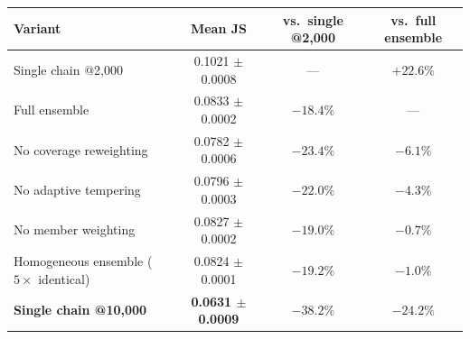 \begin{tabular}{lccc}
\toprule
Variant & Mean JS & vs.\ single @2{,}000 & vs.\ full ensemble \\
\midrule
Single chain @2{,}000 & 0.1021 $\pm$ 0.0008 & --- & $+22.6\%$ \\
Full ensemble & 0.0833 $\pm$ 0.0002 & $-18.4\%$ & --- \\
No coverage reweighting & 0.0782 $\pm$ 0.0006 & $-23.4\%$ & $-6.1\%$ \\
No adaptive tempering & 0.0796 $\pm$ 0.0003 & $-22.0\%$ & $-4.3\%$ \\
No member weighting & 0.0827 $\pm$ 0.0002 & $-19.0\%$ & $-0.7\%$ \\
Homogeneous ensemble ($5\times$ identical) & 0.0824 $\pm$ 0.0001 & $-19.2\%$ & $-1.0\%$ \\
\textbf{Single chain @10{,}000} & \textbf{0.0631 $\pm$ 0.0009} & \textbf{$-38.2\%$} & \textbf{$-24.2\%$} \\
\bottomrule
\end{tabular}
